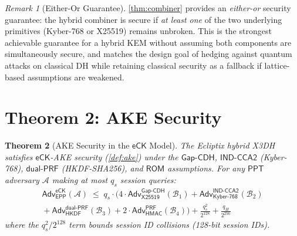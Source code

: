 \documentclass[11pt,a4paper]{article}
\newtheorem{theorem}{Theorem}[section]
\theoremstyle{definition}
\theoremstyle{remark}
\newtheorem{remark}[theorem]{Remark}
\newcommand{\ppt}{\mathsf{PPT}}
\newcommand{\adv}{\mathsf{Adv}}
\newcommand{\advA}{\mathcal{A}}
\newcommand{\advB}{\mathcal{B}}
\newcommand{\HKDF}{\mathsf{HKDF}}
\newcommand{\HMAC}{\mathsf{HMAC}}
\renewcommand{\DH}{\mathsf{X25519}}
\newcommand{\KEM}{\mathsf{Kyber\text{-}768}}
\newcommand{\GapCDH}{\mathsf{Gap\text{-}CDH}}
\newcommand{\INDCCA}{\mathsf{IND\text{-}CCA2}}
\newcommand{\PRF}{\mathsf{PRF}}
\newcommand{\dualPRF}{\mathsf{dual\text{-}PRF}}
\newcommand{\ROM}{\mathsf{ROM}}
\newcommand{\eCK}{\mathsf{eCK}}
\begin{document}
\begin{remark}[Either-Or Guarantee]
\cref{thm:combiner} provides an \emph{either-or} security guarantee: the
hybrid combiner is secure if \emph{at least one} of the two underlying
primitives (Kyber-768 or X25519) remains unbroken.  This is the strongest
achievable guarantee for a hybrid KEM without assuming both components are
simultaneously secure, and matches the design goal of hedging against
quantum attacks on classical DH while retaining classical security as a
fallback if lattice-based assumptions are weakened.
\end{remark}


\section{Theorem 2: AKE Security}
\label{sec:thm2}

\begin{theorem}[AKE Security in the $\eCK$ Model]
\label{thm:ake}
The Ecliptix hybrid X3DH satisfies $\eCK$-AKE security (\cref{def:ake})
under the $\GapCDH$, $\INDCCA$ (Kyber-768), $\dualPRF$ (HKDF-SHA256), and
$\ROM$ assumptions.  For any $\ppt$ adversary $\advA$ making at most $q_s$
session queries:
\begin{multline*}
  \adv^{\eCK}_{\mathsf{EPP}}(\advA) \;\leq\;
  q_s \cdot \bigl(
    4 \cdot \adv^{\GapCDH}_{\DH}(\advB_1) +
    \adv^{\INDCCA}_{\KEM}(\advB_2) \\
    {} + \adv^{\dualPRF}_{\HKDF}(\advB_3) +
    2 \cdot \adv^{\PRF}_{\HMAC}(\advB_4)
  \bigr) + \frac{q_s^2}{2^{128}} + \frac{q_H}{2^{256}}
\end{multline*}
where the $q_s^2 / 2^{128}$ term bounds session ID collisions (128-bit session IDs).
\end{theorem}
\end{document}
